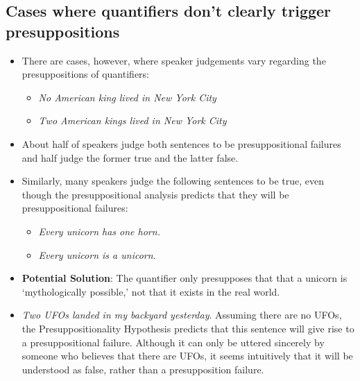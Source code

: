 \documentclass[a4paper]{article}
\begin{document}
\subsection{Cases where quantifiers don't clearly trigger presuppositions}
\begin{itemize}
\item There are cases, however, where speaker judgements vary regarding the presuppositions of quantifiers:
\begin{itemize}
\item \emph{No American king lived in New York City}
\item \emph{Two American kings lived in New York City}
\end{itemize}
\item About half of speakers judge both sentences to be presuppositional failures and half judge the former true and the latter false.
\item Similarly, many speakers judge the following sentences to be true, even though the presuppositional analysis predicts that they will be presuppositional failures:
\begin{itemize}
\item \emph{Every unicorn has one horn.}
\item \emph{Every unicorn is a unicorn.}
\end{itemize}
\item \textbf{Potential Solution}: The quantifier only presupposes that that a unicorn is `mythologically possible,' not that it exists in the real world.
\item \emph{Two UFOs landed in my backyard yesterday}. Assuming there are no UFOs, the Presuppositionality Hypothesis predicts that this sentence will give rise to a presuppositional failure. Although it can only be uttered sincerely by someone who believes that there are UFOs, it seems intuitively that it will be understood as false, rather than a presupposition failure.
\end{itemize}
\end{document}
